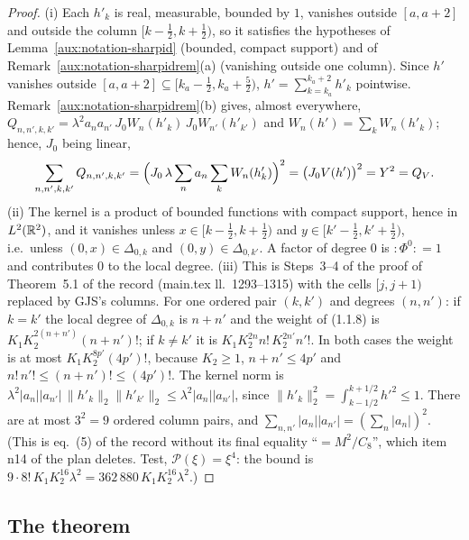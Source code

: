\begin{proof}
(i) Each $h'_k$ is real, measurable, bounded by $1$, vanishes outside $[a,a+2]$ and outside the
column $[k-\frac12,k+\frac12)$, so it satisfies the hypotheses of
Lemma~\ref{aux:notation-sharpid} (bounded, compact support) and of
Remark~\ref{aux:notation-sharpidrem}(a) (vanishing outside one column).  Since $h'$ vanishes
outside $[a,a+2]\subseteq[k_a-\frac12,k_a+\frac52)$, $h'=\sum_{k=k_a}^{k_a+2}h'_k$ pointwise.
Remark~\ref{aux:notation-sharpidrem}(b) gives, almost everywhere,
$Q_{n,n',k,k'}=\lambda^2a_na_{n'}\,J_0W_n(h'_k)\,J_0W_{n'}(h'_{k'})$ and $W_n(h')=\sum_kW_n(h'_k)$;
hence, $J_0$ being linear,
\[
 \sum_{n,n',k,k'}Q_{n,n',k,k'}=\Bigl(J_0\,\lambda\sum_na_n\sum_kW_n(h'_k)\Bigr)^2
 =\bigl(J_0V(h')\bigr)^2=Y^2=Q_V .
\]
(ii) The kernel is a product of bounded functions with compact support, hence in $L^2(\mathbb{R}^2)$, and
it vanishes unless $x\in[k-\frac12,k+\frac12)$ and $y\in[k'-\frac12,k'+\frac12)$, i.e.\ unless
$(0,x)\in\Delta_{0,k}$ and $(0,y)\in\Delta_{0,k'}$.  A factor of degree $0$ is ${:}\Phi^0{:}=1$
and contributes $0$ to the local degree.
(iii) This is Steps~3--4 of the proof of Theorem~5.1 of the record (main.tex ll.~1293--1315) with
the cells $[j,j+1)$ replaced by GJS's columns.  For one ordered pair $(k,k')$ and degrees
$(n,n')$: if $k=k'$ the local degree of $\Delta_{0,k}$ is $n+n'$ and the weight of (1.1.8) is
$K_1K_2^{2(n+n')}(n+n')!$; if $k\ne k'$ it is $K_1K_2^{2n}n!\,K_2^{2n'}n'!$.  In both cases the
weight is at most $K_1K_2^{8p'}(4p')!$, because $K_2\ge1$, $n+n'\le4p'$ and
$n!\,n'!\le(n+n')!\le(4p')!$.  The kernel norm is
$\lambda^2|a_n||a_{n'}|\,\|h'_k\|_2\|h'_{k'}\|_2\le\lambda^2|a_n||a_{n'}|$, since
$\|h'_k\|_2^2=\int_{k-1/2}^{k+1/2}h'^2\le1$.  There are at most $3^2=9$ ordered column pairs, and
$\sum_{n,n'}|a_n||a_{n'}|=(\sum_n|a_n|)^2$.  (This is eq.~(5) of the record without its final
equality ``$=M^2/C_8$'', which item n14 of the plan deletes.  Test, $\mathscr P(\xi)=\xi^4$: the
bound is $9\cdot8!\,K_1K_2^{16}\lambda^2=362\,880\,K_1K_2^{16}\lambda^2$.)
\end{proof}

\subsection{The theorem}\label{sub:d4-thm}

